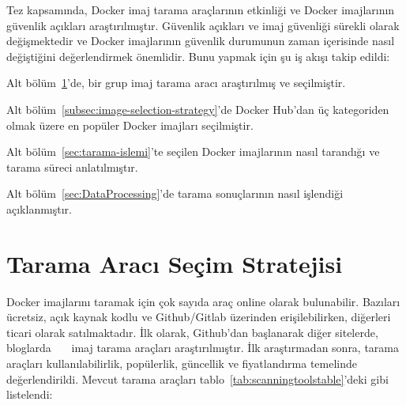 Tez kapsamında, Docker imaj tarama araçlarının etkinliği ve Docker imajlarının güvenlik açıkları araştırılmıştır. Güvenlik açıkları ve imaj güvenliği sürekli olarak değişmektedir ve Docker imajlarının güvenlik durumunun zaman içerisinde nasıl değiştiğini değerlendirmek önemlidir. Bunu yapmak için şu iş akışı takip edildi:

\begin{maddelendir}[label=$\bullet$]
    \item Alt bölüm~\ref{subsec:scanner-tool-selection}'de, bir grup imaj tarama aracı araştırılmış ve seçilmiştir.
    \item Alt bölüm~\ref{subsec:image-selection-strategy}'de Docker Hub'dan üç kategoriden olmak üzere en popüler Docker imajları seçilmiştir.
    \item Alt bölüm~\ref{sec:tarama-islemi}'te seçilen Docker imajlarının nasıl tarandığı ve tarama süreci anlatılmıştır.
    \item Alt bölüm~\ref{sec:DataProcessing}'de tarama sonuçlarının nasıl işlendiği açıklanmıştır.
\end{maddelendir}
\vspace{+12pt}

\section{Tarama Aracı Seçim Stratejisi}\label{subsec:scanner-tool-selection}

Docker imajlarını taramak için çok sayıda araç online olarak bulunabilir. Bazıları ücretsiz, açık kaynak kodlu ve Github/Gitlab üzerinden erişilebilirken, diğerleri ticari olarak satılmaktadır. İlk olarak, Github'dan başlanarak diğer sitelerde, bloglarda~\autocite{TechbeaconDockersecurity}~\autocite{5opensourcetools}~\autocite{geekflare11Container} imaj tarama araçları araştırılmıştır. İlk araştırmadan sonra, tarama araçları kullanılabilirlik, popülerlik, güncellik ve fiyatlandırma temelinde değerlendirildi. Mevcut tarama araçları tablo~\ref{tab:scanningtoolstable}'deki gibi listelendi:

